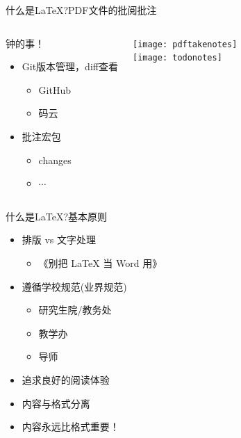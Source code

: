 \documentclass[fontset = none, xcolor=svgnames, t, aspectratio=169]{ctexbeamer}
\begin{document}
\begin{frame}[t]{什么是\LaTeX?}{PDF文件的批阅批注}
\begin{columns}[c]
\begin{spacing}{0.9}
\begin{itemize}
{{          钟}的事！}
      \begin{itemize}
      \item Git版本管理，diff查看
        \begin{itemize}
        \item {GitHub}
        \item {码云}
        \end{itemize}
      \item 批注宏包
        \begin{itemize}
        \item changes
        \item $\cdots$
        \end{itemize}
      \end{itemize}
    \end{itemize}
    \end{spacing}
  \begin{center}
    \texttt{[image: pdftakenotes]}\\
    \texttt{[image: todonotes]}
  \end{center}
\end{columns}
\end{frame}

\begin{frame}{什么是\LaTeX?}{基本原则}
  \stretchon
  \begin{itemize}
  \item 排版 vs 文字处理
    \begin{itemize}
    \item 《别把 \LaTeX{} 当 Word 用》
    \end{itemize}
  \item 遵循\alert{学校规范}(业界规范)
    \begin{itemize}
    \item 研究生院/教务处
    \item 教学办
    \item 导师
    \end{itemize}
  \item 追求良好的阅读体验
  \item 内容与格式分离
  \item \alert{内容永远比格式重要！}
  \end{itemize}
  \stretchoff
\end{frame}
\end{document}
